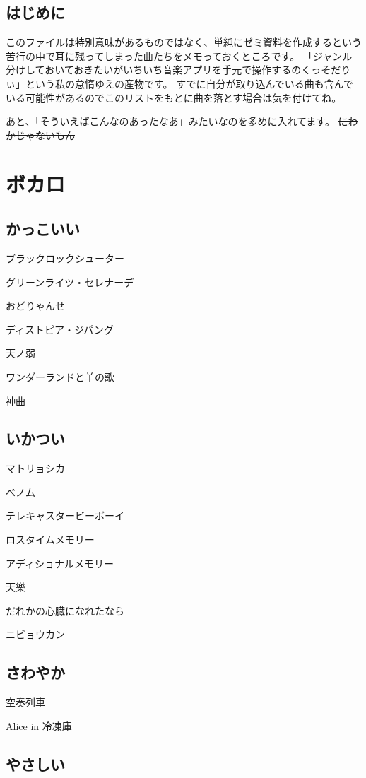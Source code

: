 \documentclass[12pt, dvipdfmx]{jsarticle}
\begin{document}
\subsection*{はじめに}

このファイルは特別意味があるものではなく、単純にゼミ資料を作成するという苦行の中で耳に残ってしまった曲たちをメモっておくところです。
「ジャンル分けしておいておきたいがいちいち音楽アプリを手元で操作するのくっそだりぃ」という私の怠惰ゆえの産物です。
すでに自分が取り込んでいる曲も含んでいる可能性があるのでこのリストをもとに曲を落とす場合は気を付けてね。

あと、「そういえばこんなのあったなあ」みたいなのを多めに入れてます。
\sout{にわかじゃないもん}

\section{ボカロ}
\subsection{かっこいい}

ブラックロックシューター

グリーンライツ・セレナーデ

おどりゃんせ

ディストピア・ジパング

天ノ弱

ワンダーランドと羊の歌

神曲

\subsection{いかつい}

マトリョシカ

ベノム

テレキャスタービーボーイ

ロスタイムメモリー

アディショナルメモリー

天樂

だれかの心臓になれたなら

ニビョウカン

\subsection{さわやか}

空奏列車

Alice in 冷凍庫

\subsection{やさしい}
\end{document}
